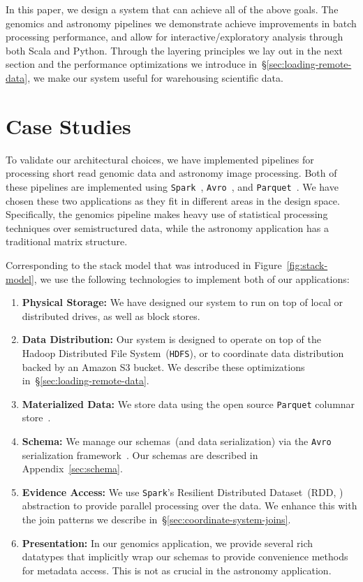 \documentclass{sig-alternate}
\begin{document}
In this paper, we design a system that can achieve all of the above goals. The genomics and
astronomy pipelines we demonstrate achieve improvements in batch processing performance, and
allow for interactive/exploratory analysis through both Scala and Python. Through the layering principles
we lay out in the next section and the performance optimizations we introduce
in~\S\ref{sec:loading-remote-data}, we make our system useful for warehousing scientific data.

\section{Case Studies}
\label{sec:case-studies}

To validate our architectural choices, we have implemented pipelines for processing short read genomic
data and astronomy image processing. Both of these pipelines are implemented using
\texttt{Spark}~\cite{zaharia10}, \texttt{Avro}~\cite{avro}, and \texttt{Parquet}~\cite{parquet}. We have chosen these two
applications as they fit in different areas in the design space. Specifically, the genomics pipeline makes
heavy use of statistical processing techniques over semistructured data, while the astronomy application
has a traditional matrix structure.

Corresponding to the stack model that was introduced in Figure~\ref{fig:stack-model}, we use the
following technologies to implement both of our applications:

\begin{enumerate}
\item \textbf{Physical Storage:} We have designed our system to run on top of local or distributed
drives, as well as block stores.
\item \textbf{Data Distribution:} Our system is designed to operate on top of the Hadoop Distributed File \linebreak
System~(\texttt{HDFS}), or to coordinate data distribution \linebreak backed by an Amazon
S3 bucket. We describe these optimizations in~\S\ref{sec:loading-remote-data}.
\item \textbf{Materialized Data:} We store data using the open source \texttt{Parquet} columnar store~\cite{parquet}.
\item \textbf{Schema:} We manage our schemas~(and data serialization) via the \texttt{Avro} serialization
framework~\cite{avro}. Our schemas are described in Appendix~\ref{sec:schema}.
\item \textbf{Evidence Access:} We use \texttt{Spark}'s Resilient \linebreak Distributed Dataset~(RDD, \cite{zaharia12})
abstraction to provide parallel processing over the data. We enhance this with the join patterns we
describe in~\S\ref{sec:coordinate-system-joins}.
\item \textbf{Presentation:} In our genomics application, we provide several rich datatypes that implicitly
wrap our schemas to provide convenience methods for metadata access. This is not as crucial in the
astronomy application.
\end{enumerate}
\end{document}

